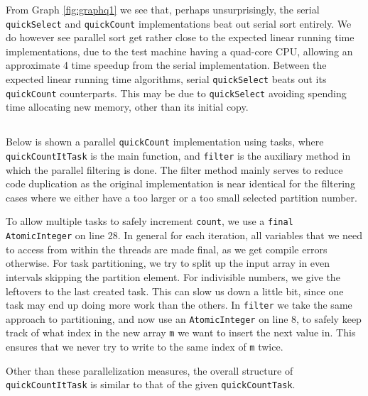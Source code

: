 \documentclass[a5paper]{article}
\begin{document}
From Graph \ref{fig:graphq1} we see that, perhaps unsurprisingly, the serial \texttt{quickSelect} and \texttt{quickCount} implementations beat out serial sort entirely.
We do however see parallel sort get rather close to the expected linear running time implementations, due to the test machine having a quad-core CPU,
allowing an approximate 4 time speedup from the serial implementation. Between the expected linear running time algorithms, serial \texttt{quickSelect} beats out its \texttt{quickCount} counterparts. This may be due to \texttt{quickSelect} avoiding spending time allocating new memory, other than its initial copy.

\subsection{}
Below is shown a parallel \texttt{quickCount} implementation using tasks, where \texttt{quickCountItTask} is the main function, and \texttt{filter} is the auxiliary method
in which the parallel filtering is done. The filter method mainly serves to reduce code duplication as the original implementation is near identical
for the filtering cases where we either have a too larger or a too small selected partition number.

To allow multiple tasks to safely increment \texttt{count}, we use a \texttt{final AtomicInteger} on line 28. In general for each iteration, all variables that we need to access
from within the threads are made final, as we get compile errors otherwise. For task partitioning, we try to split up the input array in even intervals skipping the partition element. For indivisible numbers,
we give the leftovers to the last created task. This can slow us down a little bit, since one task may end up doing more work than the others. In \texttt{filter} we take the same
approach to partitioning, and now use an \texttt{AtomicInteger} on line 8, to safely keep track of what index in the new array \texttt{m} we want to insert the next value in. This ensures that
we never try to write to the same index of \texttt{m} twice.

Other than these parallelization measures, the overall structure of \texttt{quickCountItTask} is similar to that of the given \texttt{quickCountTask}.
\end{document}

